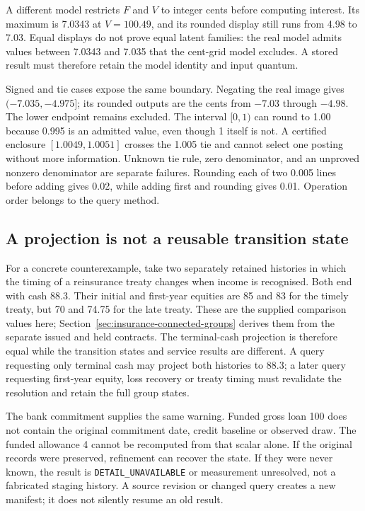 A different model restricts \(F\) and \(V\) to integer cents before computing
interest. Its maximum is 7.0343 at \(V=100.49\), and its rounded display
still runs from 4.98 to 7.03. Equal displays do not prove equal latent
families: the real model admits values between 7.0343 and 7.035 that the
cent-grid model excludes. A stored result must therefore retain the model
identity and input quantum.

Signed and tie cases expose the same boundary. Negating the real image gives
\((-7.035,-4.975]\); its rounded outputs are the cents from \(-7.03\)
through \(-4.98\). The lower endpoint remains excluded. The interval
\([0,1)\) can round to 1.00 because 0.995 is an admitted value, even though
1 itself is not. A certified enclosure \([1.0049,1.0051]\) crosses the 1.005
tie and cannot select one posting without more information. Unknown tie rule,
zero denominator, and an unproved nonzero denominator are separate failures.
Rounding each of two 0.005 lines before adding gives 0.02, while adding first
and rounding gives 0.01. Operation order belongs to the query method.

\subsection*{A projection is not a reusable transition state}

For a concrete counterexample, take two separately retained histories in which
the timing of a reinsurance treaty changes when income is recognised. Both
end with cash 88.3. Their initial and first-year equities are 85 and 83 for
the timely treaty, but 70 and 74.75 for the late treaty. These are the supplied
comparison values here; Section~\ref{sec:insurance-connected-groups} derives
them from the separate issued and held contracts. The terminal-cash
projection is therefore equal while the transition states and service results
are different. A query requesting only terminal cash may project both histories
to 88.3; a later query requesting first-year equity, loss recovery or treaty
timing must revalidate the resolution and retain the full group states.

The bank commitment supplies the same warning. Funded gross loan 100 does not
contain the original commitment date, credit baseline or observed draw. The
funded allowance 4 cannot be recomputed from that scalar alone. If the original
records were preserved, refinement can recover the state. If they were never
known, the result is \texttt{DETAIL\_UNAVAILABLE} or measurement unresolved,
not a fabricated staging history. A source revision or changed query creates
a new manifest; it does not silently resume an old result.


